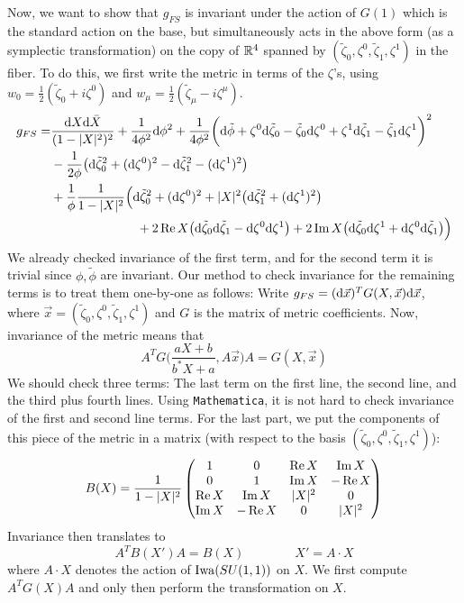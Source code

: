 \documentclass[parskip=half]{scrartcl}
\begin{document}
Now, we want to show that $g_{FS}$ is invariant under the action of $G(1)$ which is the standard action on the base, but simultaneously acts in the above form (as a symplectic transformation) on the copy of $\mathbb{R}^4$ spanned by $(\tilde\zeta_0,\zeta^0,\tilde\zeta_1,\zeta^1)$ in the fiber. To do this, we first write the metric in terms of the $\zeta$'s, using $w_0=\frac{1}{2}(\tilde \zeta_0+i\zeta^0)$ and $w_\mu=\frac{1}{2}(\tilde\zeta_\mu-i\zeta^\mu)$.
\begin{align*}
	g_{FS}=&\frac{\mathrm{d} X \mathrm{d} \bar X}{(1-\lvert X \rvert^2)^2} + \frac{1}{4\phi^2}\mathrm{d} \phi^2
	+\frac{1}{4\phi^2}\bigg(\mathrm{d} \tilde{\phi}+\zeta^0 \mathrm{d} \tilde{\zeta}_0 -\tilde{\zeta}_0 \mathrm{d} \zeta^0
	+\zeta^1 \mathrm{d} \tilde{\zeta}_1 -\tilde{\zeta}_1 \mathrm{d} \zeta^1\bigg)^2\\
	&-\frac{1}{2\phi} \big(\mathrm{d} \tilde\zeta_0^2+ (\mathrm{d} \zeta^0)^2 - \mathrm{d} \tilde \zeta_1^2 - (\mathrm{d} \zeta^1)^2\big)\\
	&+\frac{1}{\phi}\frac{1}{1-\lvert X \rvert^2}\Big(\mathrm{d} \tilde\zeta_0^2+(\mathrm{d} \zeta^0)^2
	+ \lvert X \rvert^2\big(\mathrm{d} \tilde\zeta_1^2+(\mathrm{d} \zeta^1)^2\big)\\
	&\hspace{2.4cm}+2\operatorname{Re} X \big(\mathrm{d} \tilde\zeta_0\mathrm{d} \tilde\zeta_1 - \mathrm{d} \zeta^0 \mathrm{d} \zeta^1 \big) 
	+2\operatorname{Im} X \big(\mathrm{d} \tilde\zeta_0 \mathrm{d} \zeta^1 + \mathrm{d} \zeta^0\mathrm{d} \tilde\zeta_1 \big) \Big)
\end{align*}
We already checked invariance of the first term, and for the second term it is trivial since $\phi,\tilde\phi$ are invariant. Our method to check invariance for the remaining terms is to treat them one-by-one as follows: Write $g_{FS}=(\mathrm{d} \vec x)^T G(X,\vec x) \mathrm{d} \vec x$, where $\vec x=(\tilde\zeta_0,\zeta^0,\tilde\zeta_1,\zeta^1)$ and $G$ is the matrix of metric coefficients. Now, invariance of the metric means that
\begin{equation*}
	A^T G\bigg(\frac{a X+b}{b^* X+a}, A\vec x \bigg) A=G(X,\vec x)
\end{equation*}
We should check three terms: The last term on the first line, the second line, and the third plus fourth lines. Using \texttt{Mathematica}, it is not hard to check invariance of the first and second line terms. For the last part, we put the components of this piece of the metric in a matrix (with respect to the basis $(\tilde\zeta_0,\zeta^0,\tilde\zeta_1,\zeta^1)$):
\begin{equation*}
	B(X)=
	\frac{1}{1-\lvert X \rvert^2}
	\begin{pmatrix}
		1 & 0 & \operatorname{Re} X & \operatorname{Im} X \\ 
		0 & 1 & \operatorname{Im} X & -\operatorname{Re} X\\
		\operatorname{Re} X & \operatorname{Im} X & \lvert X \rvert^2 & 0 \\
		\operatorname{Im} X & -\operatorname{Re} X & 0 & \lvert X \rvert^2
	\end{pmatrix}
\end{equation*}
Invariance then translates to 
\begin{equation*}
	A^TB(X')A=B(X) \qquad \qquad 
	X'=A\cdot X
\end{equation*}
where $A\cdot X$ denotes the action of $\operatorname{Iwa}(SU(1,1))$ on $X$. We first compute $A^TG(X)A$ and only then perform the transformation on $X$. 
\end{document}

